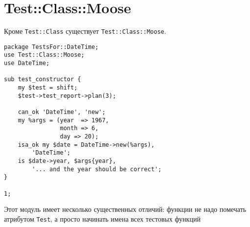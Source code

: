 \section{Test::Class::Moose}
Кроме \verb|Test::Class| существует \verb|Test::Class::Moose|.
\begin{verbatim}
package TestsFor::DateTime;
use Test::Class::Moose;
use DateTime;

sub test_constructor {
    my $test = shift;
    $test->test_report->plan(3);

    can_ok 'DateTime', 'new';
    my %args = (year  => 1967,
                month => 6,
                day => 20);
    isa_ok my $date = DateTime->new(%args),
        'DateTime';
    is $date->year, $args{year},
        '... and the year should be correct';
}

1;
\end{verbatim}
Этот модуль имеет несколько существенных отличий: функции не надо помечать атрибутом \verb|Test|, а просто начинать имена всех тестовых функций %

